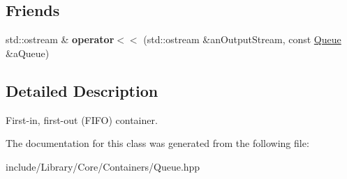 \subsection*{Friends}
\begin{DoxyCompactItemize}
\item 
\mbox{\label{classlibrary_1_1core_1_1ctnr_1_1_queue_a4c174fae5388505f1109c3cf04974617}} 
std\+::ostream \& {\bfseries operator$<$$<$} (std\+::ostream \&an\+Output\+Stream, const \hyperlink{classlibrary_1_1core_1_1ctnr_1_1_queue}{Queue} \&a\+Queue)
\end{DoxyCompactItemize}


\subsection{Detailed Description}
First-\/in, first-\/out (F\+I\+FO) container. 

The documentation for this class was generated from the following file\+:\begin{DoxyCompactItemize}
\item 
include/\+Library/\+Core/\+Containers/Queue.\+hpp\end{DoxyCompactItemize}
